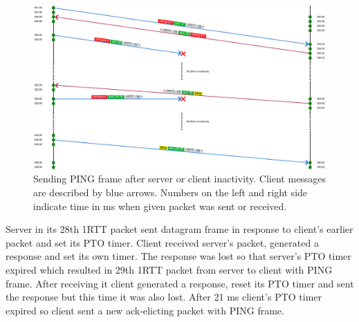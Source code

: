\begin{figure}[h]
  \centering
  \includegraphics[width=\textwidth]{img/__09__datagrams/dgram_retransmission_ping.png}
  \caption{Sending PING frame after server or client inactivity. 
  Client messages are described by blue arrows. 
  Numbers on the left and right side indicate time in ms when given packet was sent or received.}
  \label{fig:dgram_ping_frames}
\end{figure}

Server in its 28th 1RTT packet sent datagram frame in response to client's earlier packet and set its PTO timer.
Client received server's packet, generated a response and set its own timer.
The response was lost so that server's PTO timer expired which resulted in 29th 1RTT packet from server to client with PING frame. 
After receiving it client generated a response, reset its PTO timer and sent the response but this time it was also lost.
After 21 ms client's PTO timer expired so client sent a new ack-elicting packet with PING frame.
